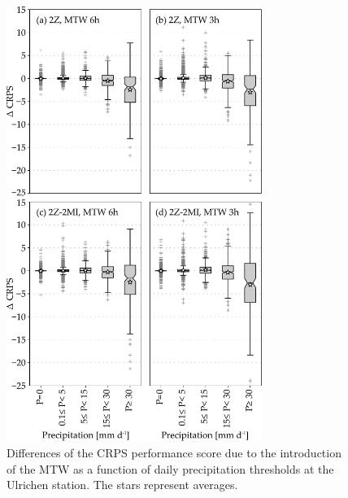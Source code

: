 \documentclass[hess, manuscript]{copernicus}
\begin{document}
	\begin{figure}[htb]
		\includegraphics[width=8.3cm]{fig10.pdf}
		\caption{Differences of the CRPS performance score due to the introduction of the MTW as a function of daily precipitation thresholds at the Ulrichen station. The stars represent averages.}
		\label{fig:changes_CRPS_precip_threshold}
	\end{figure}
	
\end{document}
